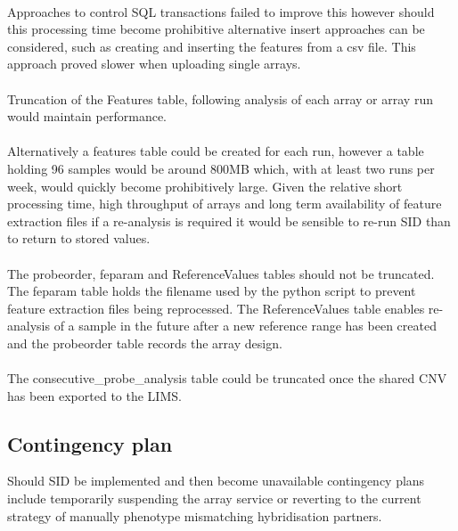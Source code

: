 \paragraph*{}
Approaches to control SQL transactions failed to improve this however should this processing time become prohibitive alternative insert approaches can be considered, such as creating and inserting the features from a \ac{csv} file. This approach proved slower when uploading single arrays.
\paragraph*{}
Truncation of the Features table, following analysis of each array or array run would maintain performance.
\paragraph*{}
Alternatively a features table could be created for each run, however a table holding 96 samples would be around 800MB which, with at least two runs per week, would quickly become prohibitively large. Given the relative short processing time, high throughput of arrays and long term availability of feature extraction files if a re-analysis is required it would be sensible to re-run SID than to return to stored values.
\paragraph*{}
The probeorder, feparam and ReferenceValues tables should not be truncated. The feparam table holds the filename used by the python script to prevent feature extraction files being reprocessed.  The ReferenceValues table enables re-analysis of a sample in the future after a new reference range has been created and the probeorder table records the array design.
\paragraph*{}
The consecutive\_probe\_analysis table could be truncated once the shared CNV has been exported to the LIMS.

\subsection{Contingency plan}
Should SID be implemented and then become unavailable contingency plans include temporarily suspending the array service or reverting to the current strategy of manually phenotype mismatching hybridisation partners.

